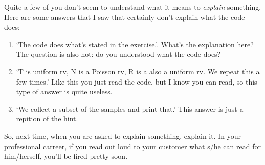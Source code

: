 \begin{exercise}[1.5]
\begin{solution}
Quite a few of you don't seem to understand what it means to \emph{explain} something. Here are some answers that I saw that certainly don't explain what the code does:
  \begin{enumerate}
  \item `The code does what's stated in the exercise.'.
    What's the explanation here?
    The question is also not: do you understood what the code does?
  \item  `T is uniform rv, N is a Poisson rv, R is a also a uniform rv. We repeat this a few times.' Like this you just read the code, but I know you can read, so this type of answer is quite useless.
  \item `We collect  a subset of the samples and print that.' This answer is just a repition of the hint.
  \end{enumerate}

  So, next time, when you are asked to explain something, explain it.
  In your professional carreer, if you read out loud to your customer what s/he can read for him/herself, you'll be fired pretty soon.
\end{solution}


\end{exercise}
